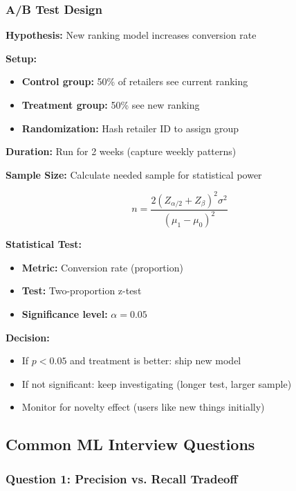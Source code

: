 \documentclass[11pt,letterpaper]{article}
\begin{document}
\subsubsection{A/B Test Design}

\textbf{Hypothesis:} New ranking model increases conversion rate

\textbf{Setup:}
\begin{itemize}
    \item \textbf{Control group:} 50\% of retailers see current ranking
    \item \textbf{Treatment group:} 50\% see new ranking
    \item \textbf{Randomization:} Hash retailer ID to assign group
\end{itemize}

\textbf{Duration:} Run for 2 weeks (capture weekly patterns)

\textbf{Sample Size:} Calculate needed sample for statistical power

\begin{equation}
n = \frac{2(Z_{\alpha/2} + Z_\beta)^2 \sigma^2}{(\mu_1 - \mu_0)^2}
\end{equation}

\textbf{Statistical Test:}
\begin{itemize}
    \item \textbf{Metric:} Conversion rate (proportion)
    \item \textbf{Test:} Two-proportion z-test
    \item \textbf{Significance level:} $\alpha = 0.05$
\end{itemize}

\textbf{Decision:}
\begin{itemize}
    \item If $p < 0.05$ and treatment is better: ship new model
    \item If not significant: keep investigating (longer test, larger sample)
    \item Monitor for novelty effect (users like new things initially)
\end{itemize}

\subsection{Common ML Interview Questions}

\subsubsection{Question 1: Precision vs. Recall Tradeoff}
\end{document}
